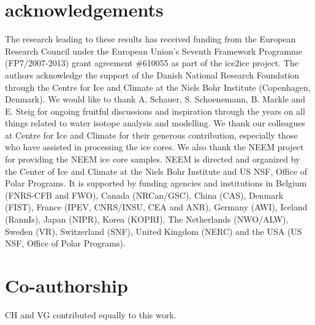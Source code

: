 \documentclass[11pt, draftcls, onecolumn]{IEEEtran} %
\numberwithin{equation}{section}
\numberwithin{table}{section}
\numberwithin{figure}{section}
\begin{document}

\section*{acknowledgements}
The research leading to these results has received funding from the European Research Council under the
European Union's Seventh Framework Programme (FP7/2007-2013) grant agreement \#610055 as part
of the ice2ice project.
The authors acknowledge the support of the Danish National Research Foundation through
the Centre for Ice and Climate at the Niels Bohr Institute (Copenhagen, Denmark).
We would like to thank A. Schauer, S. Schoenemann, B. Markle and E. Steig for ongoing fruitful discussions 
and inspiration through the years on all things related to water isotope analysis and modelling.
We thank our colleagues at Centre for Ice and Climate for their generous contribution,
especially those who have assisted in processing the ice cores.
We also thank the NEEM project for providing the NEEM ice core samples. 
NEEM is directed and organized by the Center of Ice and Climate at the Niels Bohr Institute and US
NSF, Office of Polar Programs. 
It is supported by funding agencies and institutions in Belgium (FNRS-CFB and
FWO), Canada (NRCan/GSC), China (CAS), Denmark (FIST), France (IPEV, CNRS/INSU, CEA and ANR),
Germany (AWI), Iceland (RannIs), Japan (NIPR), Korea (KOPRI), The Netherlands (NWO/ALW), Sweden (VR),
Switzerland (SNF), United Kingdom (NERC) and the USA (US NSF, Office of Polar Programs).

\section*{Co-authorship}
CH and VG contributed equally to this work.
\end{document}
